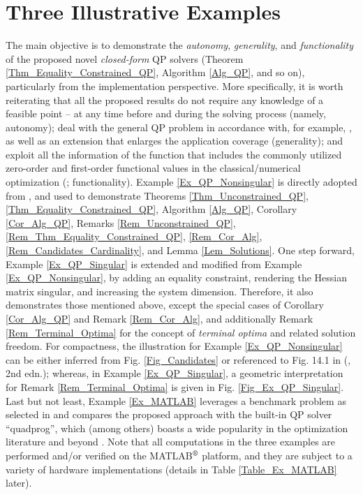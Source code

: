 \documentclass{imaman}
\numberwithin{equation}{section}
\begin{document}
\section{Three Illustrative Examples}
\label{Sec_Ex}
The main objective is to demonstrate the \textit{autonomy}, \textit{generality}, and \textit{functionality} of the proposed novel \textit{closed-form} QP solvers (Theorem \ref{Thm_Equality_Constrained_QP}, Algorithm \ref{Alg_QP}, and so on), particularly from the implementation perspective. More specifically, it is worth reiterating that all the proposed results do not require any knowledge of a feasible point -- at any time before and during the solving process (namely, autonomy); deal with the general QP problem in accordance with, for example, \cite{Lu(Ye):03(16)}, as well as an extension that enlarges the application coverage (generality); and exploit all the information of the function that includes the commonly utilized zero-order \citep{DuJoWaWi:15} and first-order functional values in the classical/numerical optimization (\cite{NoWr:06}; functionality). Example \ref{Ex_QP_Nonsingular} is directly adopted from \cite{Lu(Ye):03(16)}, and used to demonstrate Theorems \ref{Thm_Unconstrained_QP}, \ref{Thm_Equality_Constrained_QP}, Algorithm \ref{Alg_QP}, Corollary \ref{Cor_Alg_QP}, Remarks \ref{Rem_Unconstrained_QP}, \ref{Rem_Thm_Equality_Constrained_QP}, \ref{Rem_Cor_Alg}, \ref{Rem_Candidates_Cardinality}, and Lemma \ref{Lem_Solutions}. One step forward, Example \ref{Ex_QP_Singular} is extended and modified from Example \ref{Ex_QP_Nonsingular}, by adding an equality constraint, rendering the Hessian matrix singular, and increasing the system dimension. Therefore, it also demonstrates those mentioned above, except the special cases of Corollary \ref{Cor_Alg_QP} and Remark \ref{Rem_Cor_Alg}, and additionally Remark \ref{Rem_Terminal_Optima} for the concept of \textit{terminal optima} and related solution freedom. For compactness, the illustration for Example \ref{Ex_QP_Nonsingular} can be either inferred from Fig. \ref{Fig_Candidates} or referenced to Fig. 14.1 in (\cite{Lu(Ye):03(16)}, 2nd edn.); whereas, in Example \ref{Ex_QP_Singular}, a geometric interpretation for Remark \ref{Rem_Terminal_Optima} is given in Fig. \ref{Fig_Ex_QP_Singular}. Last but not least, Example \ref{Ex_MATLAB} leverages a benchmark problem as selected in \cite{MATLAB} and compares the proposed approach with the built-in QP solver ``quadprog'', which (among others) boasts a wide popularity in the optimization literature and beyond \cite{TsMa:21}. Note that all computations in the three examples are performed and/or verified on the MATLAB$\textsuperscript{\textregistered}$ platform, and they are subject to a variety of hardware implementations (details in Table \ref{Table_Ex_MATLAB} later).
\end{document}
